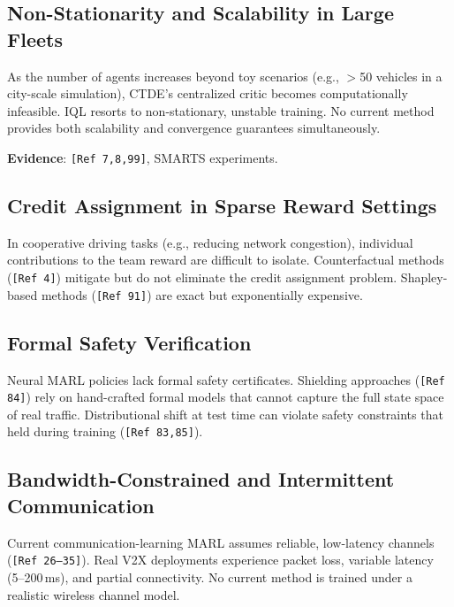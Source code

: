 \documentclass[12pt, a4paper]{article}
\begin{document}
\subsection{Non-Stationarity and Scalability in Large Fleets}

\begin{outline_note}
As the number of agents increases beyond toy scenarios (e.g.,
$>$50 vehicles in a city-scale simulation), CTDE's centralized critic
becomes computationally infeasible.  IQL resorts to
non-stationary, unstable training.  No current method provides
both scalability and convergence guarantees simultaneously.

\textbf{Evidence}: \texttt{[Ref\,7,8,99]}, SMARTS experiments.
\end{outline_note}

\subsection{Credit Assignment in Sparse Reward Settings}

\begin{outline_note}
In cooperative driving tasks (e.g., reducing network congestion),
individual contributions to the team reward are difficult to isolate.
Counterfactual methods (\texttt{[Ref\,4]}) mitigate but do not eliminate
the credit assignment problem.  Shapley-based methods (\texttt{[Ref\,91]})
are exact but exponentially expensive.
\end{outline_note}

\subsection{Formal Safety Verification}

\begin{outline_note}
Neural MARL policies lack formal safety certificates.
Shielding approaches (\texttt{[Ref\,84]}) rely on hand-crafted
formal models that cannot capture the full state space of real traffic.
Distributional shift at test time can violate safety constraints
that held during training (\texttt{[Ref\,83,85]}).
\end{outline_note}

\subsection{Bandwidth-Constrained and Intermittent Communication}

\begin{outline_note}
Current communication-learning MARL assumes reliable, low-latency
channels (\texttt{[Ref\,26--35]}).  Real V2X deployments experience
packet loss, variable latency (5--200\,ms), and partial connectivity.
No current method is trained under a realistic wireless channel model.
\end{outline_note}
\end{document}
